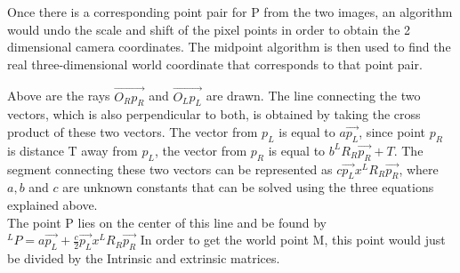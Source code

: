 \documentclass[12pt,twocolumn]{article}
\begin{document}
\indent Once there is a corresponding point pair for P from the two images, an algorithm would undo the scale and shift of the pixel points in order to obtain the 2 dimensional camera coordinates. The midpoint algorithm is then used to find the real three-dimensional world coordinate that corresponds to that point pair.\\ 
\indent Above are the rays $\vec{O_{R}p_{R}}$ and $\vec{O_{L}p_{L}}$ are drawn. The line connecting the two vectors, which is also perpendicular to both, is obtained by taking the cross product of these two vectors. The vector from $p_{L}$ is equal to $a\vec{p_{L}}$, since point $p_{R}$ is distance T away from $p_{L}$, the vector from $p_{R}$ is equal to $b^{L}R_{R}\vec{p_{R}}+T$. The segment connecting these two vectors can be represented as $c\vec{p_{L}}x^{L}R_{R}\vec{p_{R}}$, where $a,b$ and $c$ are unknown constants that can be solved using the three equations explained above. \\
The point P lies on the center of this line and be found by $^{L}P=a\vec{p_{L}}+\frac{c}{2}\vec{p_{L}}x^{L}R_{R}\vec{p_{R}}$ In order to get the world point M, this point would just be divided by the Intrinsic and extrinsic matrices.
\end{document}
